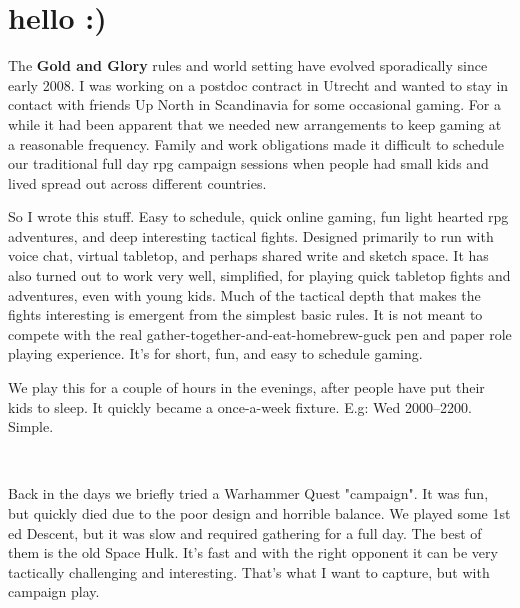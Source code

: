 \documentclass[11pt, twoside, titlepage, a4paper]{report}
\renewcommand{\chaptermark}[1]{\markboth{#1}{}}
\begin{document}
\normalsize





\cleardoublepage                   %
\thispagestyle{empty}
\raggedbottom

\chaptermark{hello}
\chapter*{hello :)}

The \textbf{Gold and Glory} rules and world setting have evolved sporadically since early 2008. I was working on a postdoc contract in Utrecht and wanted to stay in contact with friends Up North in Scandinavia for some occasional gaming. 
For a while it had been apparent that we needed new arrangements to keep gaming at a reasonable frequency. Family and work obligations made it difficult to schedule our traditional full day rpg campaign sessions when people had small kids and lived spread out across different countries.

So I wrote this stuff. Easy to schedule, quick online gaming, fun light hearted rpg adventures, and deep interesting tactical fights. Designed primarily to run with voice chat, virtual tabletop, and perhaps shared write and sketch space. It has also turned out to work very well, simplified, for playing quick tabletop fights and adventures, even with young kids. Much of the tactical depth that makes the fights interesting is emergent from the simplest basic rules.
It is not meant to compete with the real gather-together-and-eat-homebrew-guck pen and paper role playing experience. It's for short, fun, and easy to schedule gaming.

We play this for a couple of hours in the evenings, after people have put their kids to sleep. It quickly became a once-a-week fixture. E.g: Wed 2000--2200. Simple.

\

Back in the days we briefly tried a Warhammer Quest "campaign". It was fun, but quickly died due to the poor design and horrible balance. We played some 1st ed Descent, but it was slow and required gathering for a full day. The best of them is the old Space Hulk. It's fast and with the right opponent it can be very tactically challenging and interesting. That's what I want to capture, but with campaign play.
\end{document}
